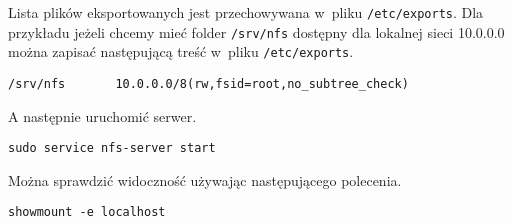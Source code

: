 \documentclass[a4paper,11pt]{article}
\begin{document}
Lista plików eksportowanych jest przechowywana w~pliku \verb|/etc/exports|.
Dla przykładu jeżeli chcemy mieć folder \verb|/srv/nfs| dostępny dla lokalnej
sieci 10.0.0.0 można zapisać następującą treść w~pliku \verb|/etc/exports|.

\begin{verbatim}
/srv/nfs       10.0.0.0/8(rw,fsid=root,no_subtree_check)
\end{verbatim}

A następnie uruchomić serwer.

\begin{verbatim}
sudo service nfs-server start
\end{verbatim}

Można sprawdzić widoczność używając następującego polecenia.

\begin{verbatim}
showmount -e localhost
\end{verbatim}
\end{document}
